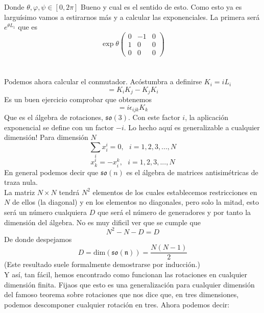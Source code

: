 \documentclass[12pt]{article}
\begin{document}
Donde $\theta, \varphi, \psi \in [0,2\pi]$ Bueno y cual es el sentido de esto. Como esto ya es larguísimo vamos a estirarnos más y a calcular las exponenciales. La primera será
$e^{\theta L_1}$ que es
\begin{equation}
    \exp {\theta \begin{pmatrix}
		0 & -1 & 0 \\ 1 & 0 & 0\\ 0&0&0
	\end{pmatrix}}
\end{equation}
\\\\
Podemos ahora calcular el conmutador. Acóstumbra a definirse $K_i=iL_i$
\begin{equation}
	[K_i,K_j]=K_iK_j-K_jK_i
\end{equation}
Es un buen ejercicio comprobar que obtenemos
\begin{equation}
	[K_i,K_j]=i\epsilon_{ijk}K_k
\end{equation}
Que es el álgebra de rotaciones, $\mathfrak{so(3)}$. Con este factor $i$, la aplicación exponencial se define con un factor $-i$.
Lo hecho aquí es generalizable a cualquier dimensión! Para dimensión $N$
\begin{equation}
	\sum_i x^i_i=0, \ \ \ i=1,2,3,...,N
\end{equation}
\begin{equation}
	x^i_k=-x^k_i, \ \ \  i=1,2,3,...,N
\end{equation}
En general podemos decir que $\mathfrak{s}\mathfrak{o}(n)$ es el álgebra de matrices antisimétricas de traza nula. \\ La matriz $N\times N$ tendrá $N^2$ elementos de los cuales establecemos restricciones en $N$ de ellos (la diagonal) y en los elementos no diagonales, pero solo la mitad, esto será un número cualquiera $D$ que será el número de generadores y por tanto la dimensión del álgebra. No es muy dificil ver que se cumple que
\begin{equation}
	N^2-N-D=D
\end{equation}
De donde despejamos 
\begin{equation}
	D=\text{dim} (\mathfrak{so(n)})=\frac{N(N-1)}{2}
\end{equation}
(Este resultado suele formalmente demostrarse por inducción.)\\
Y así, tan fácil, hemos encontrado como funcionan las rotaciones en cualquier dimensión finita. Fijaos que esto es una generalización para cualquier dimensión del famoso teorema sobre rotaciones que nos dice que, en tres dimensiones, podemos descomponer cualquier rotación en tres. Ahora podemos decir:
\end{document}
